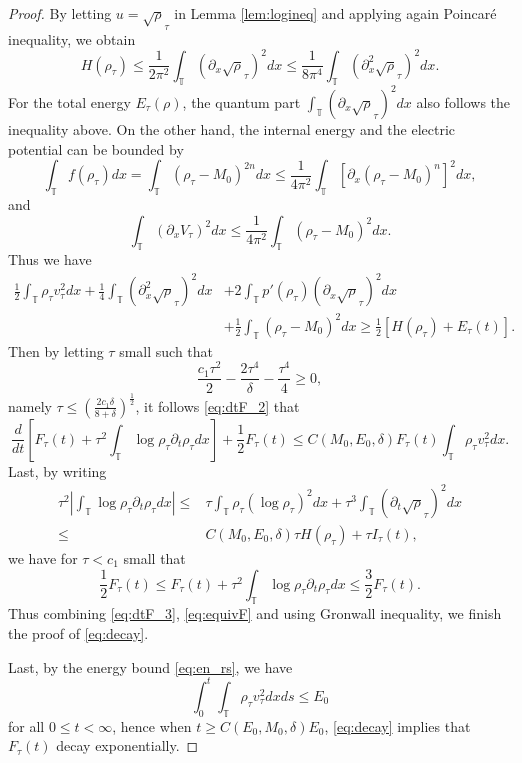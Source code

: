 \documentclass[leqno]{amsart}
\theoremstyle{plain}
\theoremstyle{definition}
\theoremstyle{remark}
\theoremstyle{plain}
\theoremstyle{plain}
\def\T{{\mathbb T}}%
\def\d{{\partial}}
\numberwithin{equation}{section}
\begin{document}
\begin{proof}
By letting $u=\sqrt\rho_\tau$ in Lemma \ref{lem:logineq} and applying again Poincar\'e inequality, we obtain
\[
H(\rho_\tau)\leq \frac{1}{2\pi^2}\int_\T (\d_x \sqrt\rho_\tau)^2dx\leq \frac{1}{8\pi^4}\int_\T (\d_x^2 \sqrt\rho_\tau)^2dx.
\]
For the total energy $E_\tau(\rho)$, the quantum part $\int_\T(\d_x\sqrt\rho_\tau)^2dx$ also follows the inequality above. On the other hand, the internal energy and the electric potential can be bounded by
\[
\int_\T f(\rho_\tau)dx=\int_\T(\rho_\tau-M_0)^{2n}dx \leq \frac{1}{4\pi^2}\int_\T[\d_x(\rho_\tau-M_0)^n]^2dx,
\]
and
\[
\int_\T(\d_xV_\tau)^2dx\leq \frac{1}{4\pi^2}\int_\T(\rho_\tau-M_0)^2dx.
\]
Thus we have
\begin{align*}
\frac{1}{2}\int_\T\rho_\tau v^2_\tau dx+\frac14\int_\T(\d_x^2\sqrt\rho_\tau)^2dx&+2\int_\T p'(\rho_\tau)(\d_x\sqrt\rho_\tau)^2dx\\
&+\frac12\int_\T(\rho_\tau-M_0)^2dx\geq \frac12[H(\rho_\tau)+E_\tau(t)].
\end{align*}
Then by letting $\tau$ small such that
\[
\frac{c_1\tau^2}{2}-\frac{2\tau^4}{\delta}-\frac{\tau^4}{4}\geq 0,
\]
namely $\tau\leq \left(\frac{2c_1\delta}{8+\delta}\right)^\frac12$, it follows \eqref{eq:dtF_2} that
\begin{equation}\label{eq:dtF_3}
\frac{d}{dt}[F_\tau(t)+\tau^2\int_\T\log\rho_\tau\d_t\rho_\tau dx]+\frac12 F_\tau(t)\leq C(M_0,E_0,\delta)F_\tau(t)\int_\T \rho_\tau v_\tau^2dx.
\end{equation}
Last, by writing
\begin{align*}
\tau^2\left|\int_\T\log\rho_\tau\d_t\rho_\tau dx\right|\leq & \tau\int_\T\rho_\tau(\log\rho_\tau)^2 dx+\tau^3\int_\T(\d_t\sqrt\rho_\tau)^2dx\\
\leq & C(M_0,E_0,\delta)\tau H(\rho_\tau)+\tau I_\tau(t),
\end{align*}
we have for $\tau< c_1$ small that
\begin{equation}\label{eq:equivF}
\frac12F_\tau(t)\leq F_\tau(t)+\tau^2\int_\T\log\rho_\tau\d_t\rho_\tau dx\leq \frac32 F_\tau(t).
\end{equation}
Thus combining \eqref{eq:dtF_3}, \eqref{eq:equivF} and using Gronwall inequality, we finish the proof of \eqref{eq:decay}.

Last, by the energy bound \eqref{eq:en_rs}, we have
\[
\int_0^t\int_\T\rho_\tau v_\tau^2dxds\leq E_0
\]
for all $0\leq t<\infty$, hence when $t\geq C(E_0,M_0,\delta)E_0$, \eqref{eq:decay} implies that $F_\tau(t)$ decay exponentially.
\end{proof}
\end{document}

